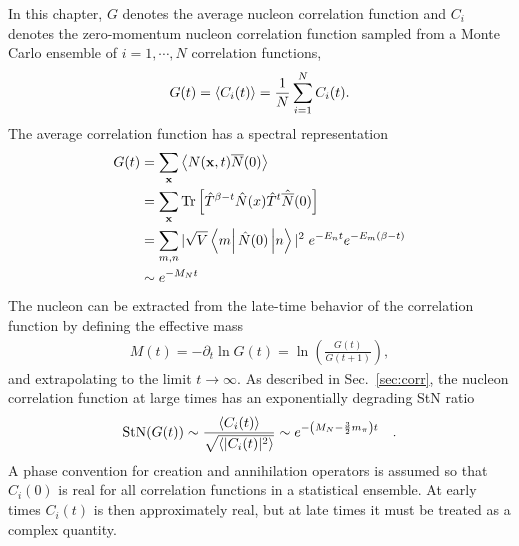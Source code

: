 In this chapter, $G$ denotes the average nucleon correlation function and $C_i$ denotes the zero-momentum nucleon correlation function sampled from a Monte Carlo ensemble of $i=1,\cdots,N$ correlation functions,
\begin{equation}
  \begin{split}
    G(t) = \left< C_i(t) \right> = \frac{1}{N}\sum_{i=1}^N C_i(t).
  \end{split}\label{GCdef}
\end{equation}
The average correlation function has a spectral representation 
\begin{equation}
  \begin{split}
    G(t) &= \sum_\v{x} \avg{N(\v{x},t) \bar{N}(0)} \\
    &= \sum_\v{x} \tr\left[ \hat{T}^{\beta - t}\hat{N}(x)\hat{T}^t \hat{\bar{N}}(0) \right]\\
    &= \sum_{m,n} |\sqrt{V}\mbraket{m}{\hat{N}(0)}{n}|^2 \; e^{-E_n t} e^{-E_m(\beta -t)}\\
    &\sim e^{-M_N t}
  \end{split}\label{eq:qcd2pt}
\end{equation}
The nucleon can be extracted from the late-time behavior of the correlation function by defining the effective mass
\begin{equation}
  \begin{split}
    M(t) = - \partial_t \ln G(t) = \ln\left( \frac{G(t)}{G(t+1)} \right),
  \end{split}\label{eq:qcdem}
\end{equation}
and extrapolating to the limit $t\rightarrow \infty$.
As described in Sec.~\ref{sec:corr},
the nucleon correlation function at large times has an exponentially degrading StN ratio 
%
\begin{equation}
  \begin{split}
    \text{StN}(G(t)) \sim \frac{\left< C_i(t) \right>}{\sqrt{\left< |C_i(t)|^2 \right>}} \sim e^{-\left( M_N - \frac{3}{2}m_\pi \right)t}
    \ \ \  .
  \end{split}\label{Lepage}
\end{equation}
%
A phase convention for creation and annihilation operators is assumed so that $C_i(0)$ is real for all correlation functions in a statistical ensemble. At early times $C_i(t)$ is then approximately real, but at late times it must be treated as a complex quantity. 



